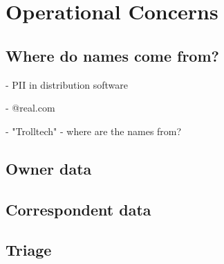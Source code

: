 \chapter{Operational Concerns}
\section{Where do names come from?}
 - PII in distribution software

   - @real.com

 - "Trolltech" - where are the names from?
\section{Owner data}
\section{Correspondent data}
\section{Triage}
